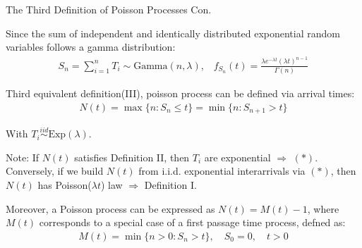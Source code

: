 \documentclass{beamer}
\begin{document}
\begin{frame}{The Third Definition of Poisson Processes Con.}

    {\footnotesize \footnotesize
   \par  Since the sum of independent and identically distributed exponential random variables follows a gamma distribution:
   \begin{align*}
    S_n = \sum_{i=1}^n T_i \sim \text{Gamma}(n, \lambda),\;\;\; f_{S_n}(t) = \frac{\lambda e^{-\lambda t} (\lambda t)^{n-1}}{\Gamma(n)}
   \end{align*}
    \par  \pause Third equivalent definition(III), poisson process can be defined via arrival times:
    \begin{align*}
        N(t) = \max\{n : S_n \leq t\} = \min\{n : S_{n+1} > t\} \tag{*}
    \end{align*}
    \par With \( T_i \overset{iid}{\sim} \text{Exp}(\lambda) \).
    \vspace{1em}
    \par\pause  Note: If \( N(t) \) satisfies Definition II, then \( T_i \) are exponential \(\Rightarrow\) $(*)$. 
    Conversely, if we build \( N(t) \) from i.i.d. exponential interarrivals via $(*)$, 
    then \( N(t) \) has Poisson(\(\lambda t\)) law \(\Rightarrow\) Definition I.
     \vspace{1em}
    \par \pause Moreover, a Poisson process can be expressed as \( N(t) = M(t) - 1 \), where $M(t)$ corresponds 
    to a special case of a first passage time process, defned as:
    \begin{align*}
        M(t) = \min\{n > 0 : S_n > t\}, \quad S_0 = 0, \quad t > 0
    \end{align*}

    }
    
\end{frame}
\end{document}
